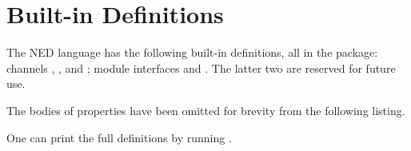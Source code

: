 \section{Built-in Definitions}
\label{sec:ned-ref:built-in-defs}

The NED language has the following built-in definitions, all in the 
package: channels , , and ;
module interfaces  and .
The latter two are reserved for future use.

The bodies of  properties have been omitted for brevity from
the following listing.

\begin{note}
One can print the full definitions by running .
\end{note}

